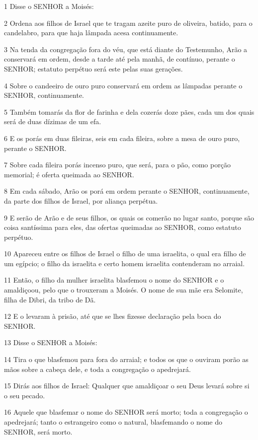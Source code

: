 \par 1 Disse o SENHOR a Moisés:
\par 2 Ordena aos filhos de Israel que te tragam azeite puro de oliveira, batido, para o candelabro, para que haja lâmpada acesa continuamente.
\par 3 Na tenda da congregação fora do véu, que está diante do Testemunho, Arão a conservará em ordem, desde a tarde até pela manhã, de contínuo, perante o SENHOR; estatuto perpétuo será este pelas suas gerações.
\par 4 Sobre o candeeiro de ouro puro conservará em ordem as lâmpadas perante o SENHOR, continuamente.
\par 5 Também tomarás da flor de farinha e dela cozerás doze pães, cada um dos quais será de duas dízimas de um efa.
\par 6 E os porás em duas fileiras, seis em cada fileira, sobre a mesa de ouro puro, perante o SENHOR.
\par 7 Sobre cada fileira porás incenso puro, que será, para o pão, como porção memorial; é oferta queimada ao SENHOR.
\par 8 Em cada sábado, Arão os porá em ordem perante o SENHOR, continuamente, da parte dos filhos de Israel, por aliança perpétua.
\par 9 E serão de Arão e de seus filhos, os quais os comerão no lugar santo, porque são coisa santíssima para eles, das ofertas queimadas ao SENHOR, como estatuto perpétuo.
\par 10 Apareceu entre os filhos de Israel o filho de uma israelita, o qual era filho de um egípcio; o filho da israelita e certo homem israelita contenderam no arraial.
\par 11 Então, o filho da mulher israelita blasfemou o nome do SENHOR e o amaldiçoou, pelo que o trouxeram a Moisés. O nome de sua mãe era Selomite, filha de Dibri, da tribo de Dã.
\par 12 E o levaram à prisão, até que se lhes fizesse declaração pela boca do SENHOR.
\par 13 Disse o SENHOR a Moisés:
\par 14 Tira o que blasfemou para fora do arraial; e todos os que o ouviram porão as mãos sobre a cabeça dele, e toda a congregação o apedrejará.
\par 15 Dirás aos filhos de Israel: Qualquer que amaldiçoar o seu Deus levará sobre si o seu pecado.
\par 16 Aquele que blasfemar o nome do SENHOR será morto; toda a congregação o apedrejará; tanto o estrangeiro como o natural, blasfemando o nome do SENHOR, será morto.

